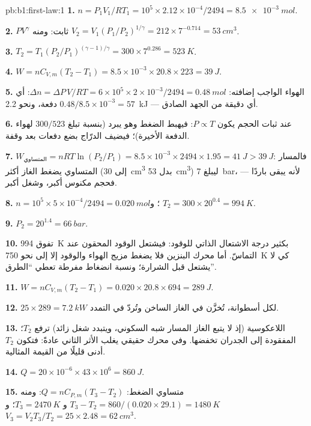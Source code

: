 \begin{solution}{pb:b1:first-law:1}
\textbf{1.} $n = P_1V_1/RT_1 = 10^5 \times 2.12\times10^{-4}/2494 = \qty{8.5e-3}{mol}$.

\textbf{2.} $PV^\gamma$ ثابت: ومنه $V_2 = V_1(P_1/P_2)^{1/\gamma} = 212 \times
7^{-0.714} = \qty{53}{cm^3}$.

\textbf{3.} $T_2 = T_1(P_2/P_1)^{(\gamma - 1)/\gamma} = 300 \times 7^{0.286} =
\qty{523}{K}$.

\textbf{4.} $W = nC_{V,m}(T_2 - T_1) = 8.5\times10^{-3} \times 20.8 \times 223 =
\qty{39}{J}$.

\textbf{5.} الهواء الواجب إضافته: $\Delta n = \Delta P\,V/RT = 6\times10^5 \times 2\times10^{-3}/
2494 = \qty{0.48}{mol}$: أي $0.48/8.5\times10^{-3} = 57$ دفعة، ونحو
\qty{2.2}{kJ} --- أي دقيقة من الجهد الصادق.

\textbf{6.} عند ثبات الحجم يكون $P \propto T$: فيهبط الضغط وهو يبرد
(بنسبة تبلغ $300/523$ لهواء الدفعة الأخيرة)؛ فيضيف الدرّاج
بضع دفعات بعد وقفة.

\textbf{7.} $W_{\text{المتساوي}} = nRT\ln(P_2/P_1) = 8.5\times10^{-3} \times 2494 \times
1.95 = \qty{41}{J} > \qty{39}{J}$: فالمسار المتساوي  يضغط الغاز
أكثر (إلى \qty{30}{cm^3} بدل \qty{53}{cm^3}) ليبلغ \qty{7}{bar}،
لأنه يبقى باردًا --- فحجم مكنوس أكبر، وشغل أكبر.

\textbf{8.} $n = 10^5 \times 5\times10^{-4}/2494 = \qty{0.020}{mol}$؛ و $T_2 =
300 \times 20^{0.4} = \qty{994}{K}$.

\textbf{9.} $P_2 = 20^{1.4} = \qty{66}{bar}$.

\textbf{10.} تفوق \qty{994}{K} بكثير درجة الاشتعال الذاتي للوقود:
فيشتعل الوقود المحقون عند التماسّ. أما محرك البنزين فلا يضغط
مزيج الهواء والوقود إلا إلى نحو \qty{750}{K} كي لا يشتعل
قبل الشرارة؛ ونسبة انضغاط مفرطة تعطي ``الطرق''.

\textbf{11.} $W = nC_{V,m}(T_2 - T_1) = 0.020 \times 20.8 \times 694 = \qty{289}{J}$.

\textbf{12.} $25 \times 289 = \qty{7.2}{kW}$ لكل أسطوانة، تُخزَّن في الغاز
الساخن وتُردّ في التمدد.

\textbf{13.} اللاعكوسية (إذ لا يتبع الغاز المسار شبه السكوني،
ويتبدد شغل زائد) ترفع $T_2$؛  المفقودة إلى الجدران
تخفضها. وفي محرك حقيقي يغلب الأثر الثاني عادةً: فتكون $T_2$ أدنى قليلًا
من القيمة المثالية.

\textbf{14.} $Q = 20\times10^{-6} \times 43\times10^6 = \qty{860}{J}$.

\textbf{15.} متساوي الضغط: $Q = nC_{P,m}(T_3 - T_2)$: ومنه $T_3 - T_2 = 860/(0.020 \times
29.1) = \qty{1480}{K}$ و $T_3 = \qty{2470}{K}$؛ و $V_3 = V_2T_3/T_2 = 25 \times
2.48 = \qty{62}{cm^3}$.


\end{solution}
